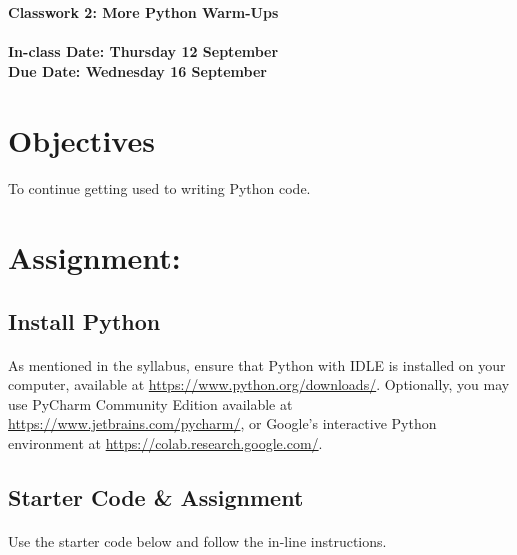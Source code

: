 \documentclass[letter,10pt]{article}
\begin{document}
    \huge
    \textbf{Classwork 2: More Python Warm-Ups}
    \normalsize
    \\ ~~ \\
    \textbf{In-class Date: Thursday 12 September} \\
    \textbf{Due Date: Wednesday 16 September}
    
    \section*{Objectives}
    \paragraph{}To continue getting used to writing Python code.
    
    \section*{Assignment:}
    \subsection{Install Python}
    \paragraph{}As mentioned in the syllabus, ensure that Python with IDLE is installed on your computer, available at \url{https://www.python.org/downloads/}. Optionally, you may use PyCharm Community Edition available at \url{https://www.jetbrains.com/pycharm/}, or Google's interactive Python environment at \url{https://colab.research.google.com/}.
    
    \subsection*{Starter Code \& Assignment}
    \paragraph{}Use the starter code below and follow the in-line instructions.
    
\end{document}
